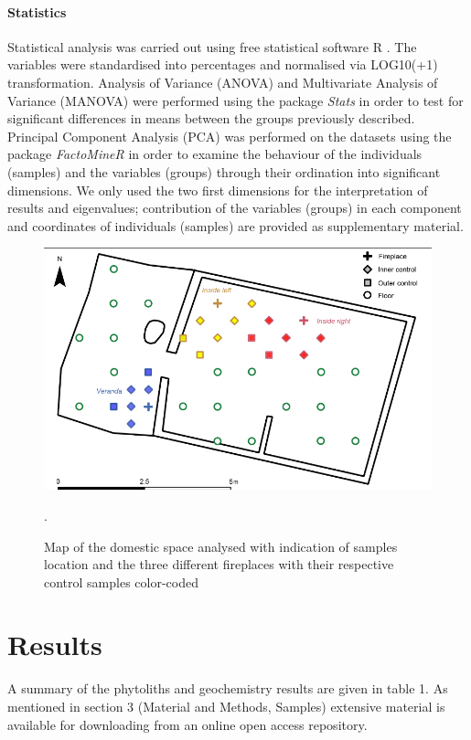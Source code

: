 \documentclass[authoryear,preprint,review,12pt]{elsarticle}
\begin{document}
\paragraph{Statistics}
Statistical analysis was carried out using free statistical software R \citep{R}. The variables were standardised into percentages and normalised via LOG10(+1) transformation.  Analysis of Variance (ANOVA) and Multivariate Analysis of Variance (MANOVA) were performed using the package \textit{Stats} \citep{R} in order to test for significant differences in means between the groups previously described. Principal Component Analysis (PCA) was performed on the datasets using the package \textit{FactoMineR} \citep{factominer} in order to examine the behaviour of the individuals (samples) and the variables (groups) through their ordination into significant dimensions. We only used the two first dimensions for the interpretation of results and eigenvalues; contribution of the variables (groups) in each component and coordinates of individuals (samples) are provided as supplementary material.

\begin{figure}[ht!]
  \begin{center}
    \includegraphics[width=15cm]{figures/figure_samples}
    \caption{Map of the domestic space analysed with indication of samples location and the three different fireplaces with their respective control samples color-coded}.
    \label{fig:samples}
  \end{center}
\end{figure}

\section{Results}
\label{sec:3}
A summary of the phytoliths and geochemistry results are given in table 1. As mentioned in section 3 (Material and Methods, Samples) extensive material is available for downloading from an online open access repository.
\end{document}
